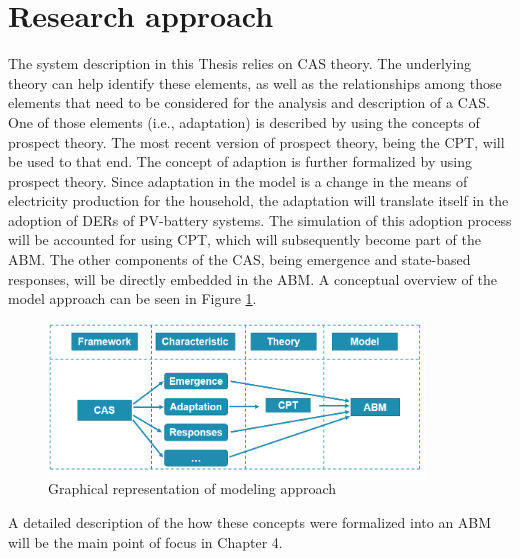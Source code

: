 \section{Research approach} \label{approach}
The system description in this Thesis relies on CAS theory. The underlying theory can help identify these elements, as well as the relationships among those elements that need to be considered for the analysis and description of a CAS. One of those elements (i.e., adaptation) is described by using the concepts of prospect theory. The most recent version of prospect theory, being the CPT, will be used to that end. 
\newline \newline \noindent
The concept of adaption is further formalized by using prospect theory. Since adaptation in the model is a change in the means of electricity production for the household, the adaptation will translate itself in the adoption of DERs of PV-battery systems. The simulation of this adoption process will be accounted for using CPT, which will subsequently become part of the ABM. The other components of the CAS, being emergence and state-based responses, will be directly embedded in the ABM. A conceptual overview of the model approach can be seen in Figure \ref{Figure:approach}.
\newline 
\begin{figure}[h!]
\centering
\includegraphics[width=10cm]{approach.PNG}
\caption{Graphical representation of modeling approach}
\label{Figure:approach}
\end{figure}
\newline \noindent
A detailed description of the how these concepts were formalized into an ABM will be the main point of focus in Chapter 4.
